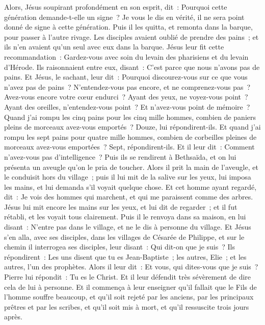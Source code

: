 \begin{multicols}{2}
Alors, Jésus soupirant profondément en son esprit, dit~: Pourquoi cette génération demande-t-elle un signe~? Je vous le dis en vérité, il ne sera point donné de signe à cette génération.
Puis il les quitta, et remonta dans la barque, pour passer à l'autre rivage.
Les disciples avaient oublié de prendre des pains~; et ils n'en avaient qu'un seul avec eux dans la barque.
Jésus leur fit cette recommandation~: Gardez-vous avec soin du levain des pharisiens et du levain d'Hérode.
Ils raisonnaient entre eux, disant~: C'est parce que nous n'avons pas de pains.
Et Jésus, le sachant, leur dit~: Pourquoi discourez-vous sur ce que vous n'avez pas de pains~? N'entendez-vous pas encore, et ne comprenez-vous pas~?
Avez-vous encore votre cœur endurci~? Ayant des yeux, ne voyez-vous point~? Ayant des oreilles, n'entendez-vous point~? Et n'avez-vous point de mémoire~?
Quand j'ai rompu les cinq pains pour les cinq mille hommes, combien de paniers pleins de morceaux avez-vous emportés~? Douze, lui répondirent-ils.
Et quand j'ai rompu les sept pains pour quatre mille hommes, combien de corbeilles pleines de morceaux avez-vous emportées~? Sept, répondirent-ils.
Et il leur dit~: Comment n'avez-vous pas d'intelligence~?
Puis ils se rendirent à Bethsaïda, et on lui présenta un aveugle qu'on le pria de toucher.
Alors il prit la main de l'aveugle, et le conduisit hors du village~; puis il lui mit de la salive sur les yeux, lui imposa les mains, et lui demanda s'il voyait quelque chose.
Et cet homme ayant regardé, dit~: Je vois des hommes qui marchent, et qui me paraissent comme des arbres.
Jésus lui mit encore les mains sur les yeux, et lui dit de regarder~; et il fut rétabli, et les voyait tous clairement.
Puis il le renvoya dans sa maison, en lui disant~: N'entre pas dans le village, et ne le dis à personne du village.
Et Jésus s'en alla, avec ses disciples, dans les villages de Césarée de Philippe, et sur le chemin il interrogea ses disciples, leur disant~: Qui dit-on que je suis~?
Ils répondirent~: Les uns disent que tu es Jean-Baptiste~; les autres, Elie~; et les autres, l'un des prophètes.
Alors il leur dit~: Et vous, qui dites-vous que je suis~? Pierre lui répondit~: Tu es le Christ.
Et il leur défendit très sévèrement de dire cela de lui à personne.
Et il commença à leur enseigner qu'il fallait que le Fils de l'homme souffre beaucoup, et qu'il soit rejeté par les anciens, par les principaux prêtres et par les scribes, et qu'il soit mis à mort, et qu'il ressuscite trois jours après.

\end{multicols}
